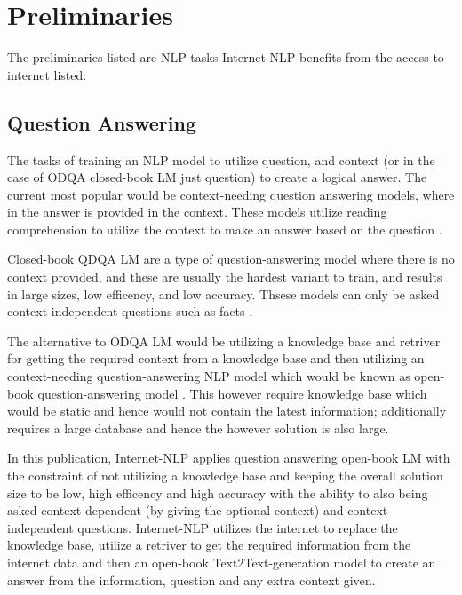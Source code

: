\section{Preliminaries}

The preliminaries listed are NLP tasks Internet-NLP benefits from the access to internet listed:

\subsection{Question Answering}

The tasks of training an NLP model to utilize question, and context (or in the case of ODQA closed-book LM just question) to create a logical answer. The current most popular would be context-needing question answering models, where in the answer is provided in the context. These models utilize reading comprehension to utilize the context to make an answer based on the question \cite{https://doi.org/10.48550/arxiv.2002.08910}. 

Closed-book QDQA LM are a type of question-answering model where there is no context provided, and these are usually the hardest variant to train, and results in large sizes, low efficency, and low accuracy. Thsese models can only be asked context-independent questions such as facts \cite{https://doi.org/10.48550/arxiv.2002.08910}.

The alternative to ODQA LM would be utilizing a knowledge base and retriver for getting the required context from a knowledge base and then utilizing an context-needing question-answering NLP model which would be known as open-book question-answering model \cite{https://doi.org/10.48550/arxiv.2002.08910}. This however require knowledge base which would be static and hence would not contain the latest information; additionally requires a large database and hence the however solution is also large.

In this publication, Internet-NLP applies question answering open-book LM with the constraint of not utilizing a knowledge base and keeping the overall solution size to be low, high efficency and high accuracy with the ability to also being asked context-dependent (by giving the optional context) and context-independent questions. Internet-NLP utilizes the internet to replace the knowledge base, utilize a retriver to get the required information from the internet data and then an open-book Text2Text-generation model to create an answer from the information, question and any extra context given.

